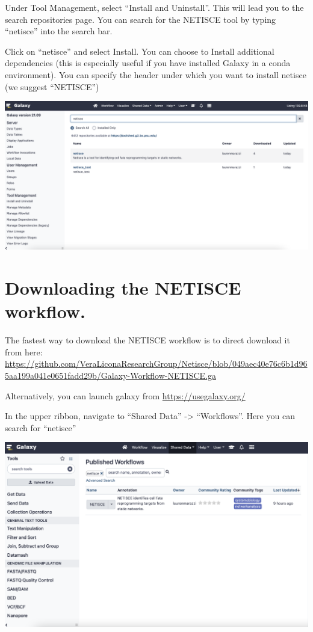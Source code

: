 \documentclass[
]{book}
\begin{document}
Under Tool Management, select ``Install and Uninstall''. This will lead you to the search repositories page. You can search for the NETISCE tool by typing ``netisce'' into the search bar.

Click on ``netisce'' and select Install. You can choose to Install additional dependencies (this is especially useful if you have installed Galaxy in a conda environment). You can specify the header under which you want to install netisce (we suggest ``NETISCE'')

\begin{center}\includegraphics[width=1\linewidth]{images/galaxy2} \end{center}

\hypertarget{downloading-the-netisce-workflow.}{%
\section{Downloading the NETISCE workflow.}\label{downloading-the-netisce-workflow.}}

The fastest way to download the NETISCE workflow is to direct download it from here: \url{https://github.com/VeraLiconaResearchGroup/Netisce/blob/049aec40e76c6b1d965aa199a041e0651fadd29b/Galaxy-Workflow-NETISCE.ga}

Alternatively, you can launch galaxy from \url{https://usegalaxy.org/}

In the upper ribbon, navigate to ``Shared Data'' -\textgreater{} ``Workflows''. Here you can search for ``netisce''

\begin{center}\includegraphics[width=1\linewidth]{images/galaxy3} \end{center}
\end{document}
